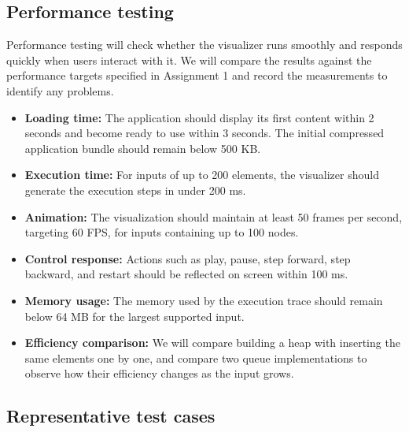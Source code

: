 \documentclass[11pt,a4paper]{article}
\begin{document}
\subsection{Performance testing}

Performance testing will check whether the visualizer runs smoothly and responds quickly when users interact with it. We will compare the results against the performance targets specified in Assignment 1 and record the measurements to identify any problems. 



\begin{itemize}
    \item \textbf{Loading time:} The application should display its first
    content within 2 seconds and become ready to use within 3 seconds.
    The initial compressed application bundle should remain below 500 KB.

    \item \textbf{Execution time:} For inputs of up to 200 elements,
    the visualizer should generate the execution steps in under 200 ms.

    \item \textbf{Animation:} The visualization should maintain at least
    50 frames per second, targeting 60 FPS, for inputs containing up to
    100 nodes.

    \item \textbf{Control response:} Actions such as play, pause, step
    forward, step backward, and restart should be reflected on screen
    within 100 ms.

    \item \textbf{Memory usage:} The memory used by the execution trace
    should remain below 64 MB for the largest supported input.

    \item \textbf{Efficiency comparison:} We will compare building a heap
    with inserting the same elements one by one, and compare two queue
    implementations to observe how their efficiency changes as the input
    grows.
\end{itemize} 


\subsection{Representative test cases}
\end{document}
